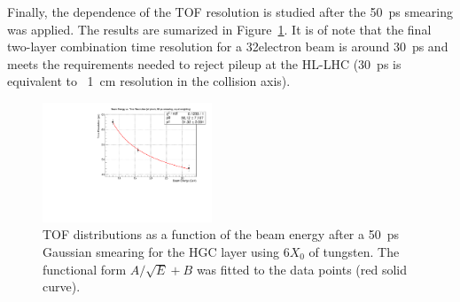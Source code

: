 Finally, the dependence of the TOF resolution is studied after the
50~ps smearing was applied. The results are sumarized in
Figure~\ref{hgc:TOF_vs_beamEnergy_Smeared}.
It is of note that the final
two-layer combination time
resolution for a 32\GeV electron beam is around 30~ps and meets the
requirements needed to reject pileup at the HL-LHC (30~ps is
equivalent to ~1~cm resolution in the collision axis).
\begin{figure}[h] 
\centering
\includegraphics[width=0.45\textwidth]{HGC/TOF_vs_beamEnergy_50_ps_smearing.pdf} 
\caption{TOF distributions as a function of the beam energy after a 50~ps Gaussian smearing for 
  the HGC layer using 6$X_{0}$ of tungsten. The functional form $A/\sqrt{E} +
B$ was fitted to the data points (red solid curve).} 
\label{hgc:TOF_vs_beamEnergy_Smeared} 
\end{figure}
